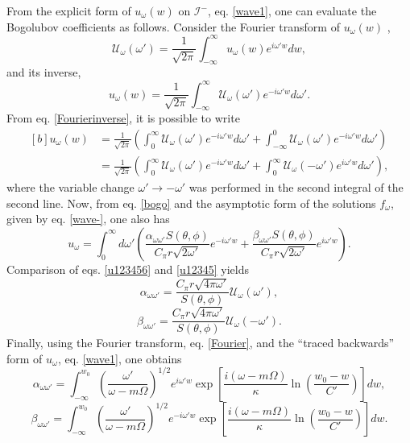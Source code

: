 \documentclass[
12pt,		%
openright,	%
twoside,  %
a4paper,			%
chapter=TITLE,		%
english,			%
french,				%
spanish,			%
brazil				%
]{USPSC-classe/USPSC}
\begin{document}
From the explicit form of $u_{\omega}(w)$ on $\mathscr{I}^-$, eq. \ref{wave1}, one can evaluate the Bogolubov coefficients as follows. Consider the Fourier transform of $u_{\omega}(w)$ \cite{Butkov1973},
\begin{equation}\label{Fourier}
    \mathcal{U}_{\omega}(\omega')=\frac{1}{\sqrt{2\pi}}\int^{\infty}_{-\infty}u_{\omega}(w)e^{i\omega'w}dw,
\end{equation}
and its inverse,
\begin{equation}\label{Fourierinverse}
    u_{\omega}(w)=\frac{1}{\sqrt{2\pi}}\int^{\infty}_{-\infty}\mathcal{U}_{\omega}(\omega')e^{-i\omega'w}d\omega'.
\end{equation}
From eq. \ref{Fourierinverse}, it is possible to write
\begin{equation}\label{u123456}
    \begin{aligned}[b]
    u_{\omega}(w) & = \frac{1}{\sqrt{2\pi}}\left(\int^{\infty}_{0}\mathcal{U}_{\omega}(\omega')e^{-i\omega'w}d\omega'+\int^{0}_{-\infty}\mathcal{U}_{\omega}(\omega')e^{-i\omega'w}d\omega'\right)\\
    & = \frac{1}{\sqrt{2\pi}}\left(\int^{\infty}_{0}\mathcal{U}_{\omega}(\omega')e^{-i\omega'w}d\omega'+\int_{0}^{\infty}\mathcal{U}_{\omega}(-\omega')e^{i\omega'w}d\omega'\right),
    \end{aligned}
\end{equation}
where the variable change $\omega'\to-\omega'$ was performed in the second integral of the second line. Now, from eq. \ref{bogo} and the asymptotic form of the solutions  $f_{\omega}$, given by eq. \ref{wave-}, one also has
\begin{equation}\label{u12345}
    u_{\omega}=\int^{\infty}_{0} d\omega'\left(\frac{\alpha_{\omega\omega'}S(\theta,\phi)}{C_{\pi}r\sqrt{2\omega'}}e^{-i\omega'w}+\frac{\beta_{\omega\omega'}S(\theta,\phi)}{C_{\pi}r\sqrt{2\omega'}}e^{i\omega'w}\right).
\end{equation}
Comparison of eqs. \ref{u123456} and \ref{u12345} yields
\begin{equation}
    \alpha_{\omega\omega'}=\frac{C_{\pi}r\sqrt{4\pi\omega'}}{S(\theta,\phi)}\mathcal{U}_{\omega}(\omega'),
\end{equation}
\begin{equation}
    \beta_{\omega\omega'}=\frac{C_{\pi}r\sqrt{4\pi\omega'}}{S(\theta,\phi)}\mathcal{U}_{\omega}(-\omega').
\end{equation}
Finally, using the Fourier transform, eq. \ref{Fourier}, and the ``traced backwards'' form of $u_{\omega}$, eq. \ref{wave1}, one obtains
\begin{equation}\label{alpha1}
    \alpha_{\omega\omega'}=\int^{w_0}_{-\infty}\left(\frac{\omega'}{\omega-m\Omega}\right)^{1/2}e^{i\omega'w}\exp\left[{\frac{i(\omega-m\Omega)}{\kappa}\ln\left({\frac{w_0-w}{C'}}\right)}\right]dw,
\end{equation}
\begin{equation}\label{beta1}
    \beta_{\omega\omega'}=\int^{w_0}_{-\infty}\left(\frac{\omega'}{\omega-m\Omega}\right)^{1/2}e^{-i\omega'w}\exp\left[{\frac{i(\omega-m\Omega)}{\kappa}\ln\left({\frac{w_0-w}{C'}}\right)}\right]dw.
\end{equation}
\end{document}
